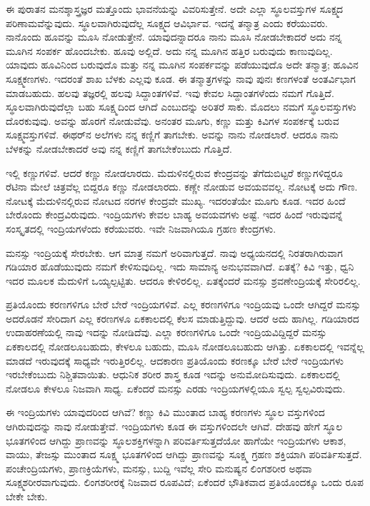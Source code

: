 ಈ ಪುರಾತನ ಮನಶ್ಶಾಸ್ತ್ರಜ್ಞರ ಮತ್ತೊಂದು ಭಾವನೆಯನ್ನು ವಿವರಿಸುತ್ತೇನೆ. ಅದೇ ಎಲ್ಲಾ ಸ್ಥೂಲವಸ್ತುಗಳ ಸೂಕ್ಷ್ಮದ ಪರಿಣಾಮವೆನ್ನುವುದು. ಸ್ಥೂಲವಾಗಿರುವುದೆಲ್ಲ ಸೂಕ್ಷ್ಮದ ಆವಿರ್ಭಾವ. ಇದನ್ನೆ ತನ್ಮಾತ್ರ ಎಂದು ಕರೆಯುವರು. ನಾನೊಂದು ಹೂವನ್ನು ಮೂಸಿ ನೋಡುತ್ತೇನೆ. ಯಾವುದನ್ನಾದರೂ ನಾನು ಮೂಸಿ ನೋಡಬೇಕಾದರೆ ಅದು ನನ್ನ ಮೂಗಿನ ಸಂಪರ್ಕ ಹೊಂದಬೇಕು. ಹೂವು ಅಲ್ಲಿದೆ. ಅದು ನನ್ನ ಮೂಗಿನ ಹತ್ತಿರ ಬರುವುದು ಕಾಣುವುದಿಲ್ಲ. ಯಾವುದು ಹೂವಿನಿಂದ ಬರುವುದೊ ಮತ್ತು ನನ್ನ ಮೂಗಿನ ಸಂಪರ್ಕವನ್ನು ಪಡೆಯುವುದೊ ಅದೇ ತನ್ಮಾತ್ರ; ಹೂವಿನ ಸೂಕ್ಷ್ಮಕಣಗಳು. ಇದರಂತೆ ಶಾಖ ಬೆಳಕು ಎಲ್ಲವು ಕೂಡ. ಈ ತನ್ಮಾತ್ರಗಳನ್ನು ನಾವು ಪುನಃ ಕಣಗಳಂತೆ ಅಂತರ್ವಿಭಾಗ ಮಾಡಬಹುದು. ಹಲವು ತಜ್ಞರಲ್ಲಿ ಹಲವು ಸಿದ್ದಾಂತಗಳಿವೆ. ಇವು ಕೇವಲ ಸಿದ್ದಾಂತಗಳೆಂದು ನಮಗೆ ಗೊತ್ತಿದೆ. ಸ್ಥೂಲವಾಗಿರುವುದೆಲ್ಲಾ ಬಹು ಸೂಕ್ಷ್ಮದಿಂದ ಆಗಿದೆ ಎಂಬುದನ್ನು ಅರಿತರೆ ಸಾಕು. ಮೊದಲು ನಮಗೆ ಸ್ಥೂಲವಸ್ತುಗಳು ದೊರಕುವುವು. ಅವನ್ನು ಹೊರಗೆ ನೋಡುವೆವು. ಅನಂತರ ಮೂಗು, ಕಣ್ಣು ಮತ್ತು ಕಿವಿಗಳ ಸಂಪರ್ಕಕ್ಕೆ ಬರುವ ಸೂಕ್ಷ್ಮವಸ್ತುಗಳಿವೆ. ಈಥರ್‌ನ ಅಲೆಗಳು ನನ್ನ ಕಣ್ಣಿಗೆ ತಾಗಬೇಕು. ಅವನ್ನು ನಾನು ನೋಡಲಾರೆ. ಆದರೂ ನಾನು ಬೆಳಕನ್ನು ನೋಡಬೇಕಾದರೆ ಅವು ನನ್ನ ಕಣ್ಣಿಗೆ ತಾಗಬೇಕೆಂಬುದು ಗೊತ್ತಿದೆ.

ಇಲ್ಲಿ ಕಣ್ಣುಗಳಿವೆ. ಆದರೆ ಕಣ್ಣು ನೋಡಲಾರದು. ಮೆದುಳಿನಲ್ಲಿರುವ ಕೇಂದ್ರವನ್ನು ತೆಗೆದುಬಿಟ್ಟರೆ ಕಣ್ಣುಗಳಿದ್ದರೂ ರೆಟಿನಾ ಮೇಲೆ ಚಿತ್ರವೆಲ್ಲ ಬಿದ್ದರೂ ಕಣ್ಣು ನೋಡಲಾರದು. ಕಣ್ಣೇ ನೋಡುವ ಅವಯವವಲ್ಲ. ನೋಟಕ್ಕೆ ಅದು ಗೌಣ. ನೋಟಕ್ಕೆ ಮೆದುಳಿನಲ್ಲಿರುವ ನೋಟದ ನರಗಳ ಕೇಂದ್ರವೇ ಮುಖ್ಯ. ಇದರಂತೆಯೇ ಮೂಗು ಕೂಡ. ಇದರ ಹಿಂದೆ ಬೇರೊಂದು ಕೇಂದ್ರವಿರುವುದು. ಇಂದ್ರಿಯಗಳು ಕೇವಲ ಬಾಹ್ಯ ಅವಯವಗಳು ಅಷ್ಟೆ. ಇದರ ಹಿಂದೆ ಇರುವುವನ್ನೆ ಸಂಸ್ಕೃತದಲ್ಲಿ ಇಂದ್ರಿಯಗಳೆಂದು ಕರೆಯುವರು. ಇವೇ ನಿಜವಾಗಿಯೂ ಗ್ರಹಣ ಕೇಂದ್ರಗಳು.

ಮನಸ್ಸು ಇಂದ್ರಿಯಕ್ಕೆ ಸೇರಬೇಕು. ಆಗ ಮಾತ್ರ ನಮಗೆ ಅರಿವಾಗುತ್ತದೆ. ನಾವು ಅಧ್ಯಯನದಲ್ಲಿ ನಿರತರಾಗಿರುವಾಗ ಗಡಿಯಾರ ಹೊಡೆಯುವುದು ನಮಗೆ ಕೇಳಿಸುವುದಿಲ್ಲ. ಇದು ಸಾಮಾನ್ಯ ಅನುಭವವಾಗಿದೆ. ಏತಕ್ಕೆ? ಕಿವಿ ಇತ್ತು, ಧ್ವನಿ ಇದರ ಮೂಲಕ ಮೆದುಳಿಗೆ ಒಯ್ಯಲ್ಪಟ್ಟಿತು. ಆದರೂ ಕೇಳಿರಲಿಲ್ಲ. ಏತಕ್ಕೆಂದರೆ ಮನಸ್ಸು ಶ್ರವಣೇಂದ್ರಿಯಕ್ಕೆ ಸೇರಿರಲಿಲ್ಲ.

ಪ್ರತಿಯೊಂದು ಕರಣಗಳಿಗೂ ಬೇರೆ ಬೇರೆ ಇಂದ್ರಿಯಗಳಿವೆ. ಎಲ್ಲ ಕರಣಗಳಿಗೂ ಇಂದ್ರಿಯವು ಒಂದೇ ಆಗಿದ್ದರೆ ಮನಸ್ಸು ಅದರೊಡನೆ ಸೇರಿದಾಗ ಎಲ್ಲ ಕರಣಗಳೂ ಏಕಕಾಲದಲ್ಲಿ ಕೆಲಸ ಮಾಡುತ್ತಿದ್ದುವು. ಆದರೆ ಅದು ಹಾಗಿಲ್ಲ. ಗಡಿಯಾರದ ಉದಾಹರಣೆಯಲ್ಲಿ ನಾವು ಇದನ್ನು ನೋಡಿದೆವು. ಎಲ್ಲಾ ಕರಣಗಳಿಗೂ ಒಂದೇ ಇಂದ್ರಿಯವಿದ್ದಿದ್ದರೆ ಮನಸ್ಸು ಏಕಕಾಲದಲ್ಲಿ ನೋಡಲೂಬಹುದು, ಕೇಳಲೂ ಬಹುದು, ಮೂಸಿ ನೋಡಲೂಬಹುದು ಆಗಿತ್ತು. ಏಕಕಾಲದಲ್ಲಿ ಇವನ್ನೆಲ್ಲ ಮಾಡದೆ ಇರುವುದಕ್ಕೆ ಸಾಧ್ಯವೇ ಇರುತ್ತಿರಲಿಲ್ಲ. ಆದಕಾರಣ ಪ್ರತಿಯೊಂದು ಕರಣಕ್ಕೂ ಬೇರೆ ಬೇರೆ ಇಂದ್ರಿಯಗಳು ಇರಬೇಕೆಂಬುದು ನಿಶ್ಚಿತವಾಯಿತು. ಆಧುನಿಕ ಶರೀರ ಶಾಸ್ತ್ರ ಕೂಡ ಇದನ್ನು ಅನುಮೋದಿಸುವುದು. ಏಕಕಾಲದಲ್ಲಿ ನೋಡಲೂ ಕೇಳಲೂ ನಿಜವಾಗಿ ಸಾಧ್ಯ. ಏಕೆಂದರೆ ಮನಸ್ಸು ಎರಡು ಇಂದ್ರಿಯಗಳಲ್ಲಿಯೂ ಸ್ವಲ್ಪ ಸ್ವಲ್ಪವಿರುವುದು.

ಈ ಇಂದ್ರಿಯಗಳು ಯಾವುದರಿಂದ ಆಗಿವೆ? ಕಣ್ಣು ಕಿವಿ ಮುಂತಾದ ಬಾಹ್ಯ ಕರಣಗಳು ಸ್ಥೂಲ ವಸ್ತುಗಳಿಂದ ಆಗಿರುವುದನ್ನು ನಾವು ನೋಡುತ್ತೇವೆ. ಇಂದ್ರಿಯಗಳು ಕೂಡ ಈ ವಸ್ತುಗಳಿಂದಲೇ ಆಗಿವೆ. ದೇಹವು ಹೇಗೆ ಸ್ಥೂಲ ಭೂತಗಳಿಂದ ಆಗಿದ್ದು ಪ್ರಾಣವನ್ನು ಸ್ಥೂಲಶಕ್ತಿಗಳನ್ನಾಗಿ ಪರಿವರ್ತಿಸುತ್ತದೆಯೋ ಹಾಗೆಯೇ ಇಂದ್ರಿಯಗಳು ಆಕಾಶ, ವಾಯು, ತೇಜಸ್ಸು ಮುಂತಾದ ಸೂಕ್ಷ್ಮ ಭೂತಗಳಿಂದ ಆಗಿದ್ದು ಪ್ರಾಣವನ್ನು ಸೂಕ್ಷ್ಮ ಗ್ರಹಣ ಶಕ್ತಿಯಾಗಿ ಪರಿವರ್ತಿಸುತ್ತದೆ. ಪಂಚೇಂದ್ರಿಯಗಳು, ಪ್ರಾಣಕ್ರಿಯೆಗಳು, ಮನಸ್ಸು, ಬುದ್ದಿ ಇವೆಲ್ಲ ಸೇರಿ ಮನುಷ್ಯನ ಲಿಂಗಶರೀರ ಅಥವಾ ಸೂಕ್ಷ್ಮಶರೀರವಾಗುವುದು. ಲಿಂಗಶರೀರಕ್ಕೆ ನಿಜವಾದ ರೂಪವಿದೆ; ಏಕೆಂದರೆ ಭೌತಿಕವಾದ ಪ್ರತಿಯೊಂದಕ್ಕೂ ಒಂದು ರೂಪ ಬೇಕೇ ಬೇಕು.

